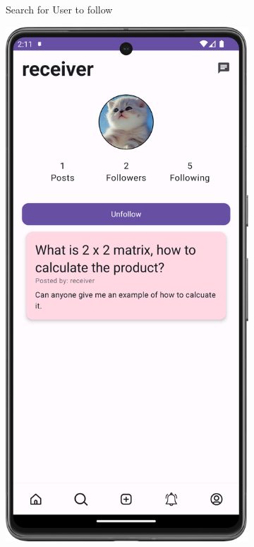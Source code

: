\begin{figure}[H]
\begin{subfigure}[b]{0.3\textwidth}
    \caption{Search for User to follow}
    \label{fig:search_follow_user}
  \end{subfigure}
  \hfill
  \begin{subfigure}[b]{0.3\textwidth}
    \includegraphics[width=\textwidth]{Figures/Product_Images/Auth/after_follow_user.png}

\end{subfigure}
\end{figure}
